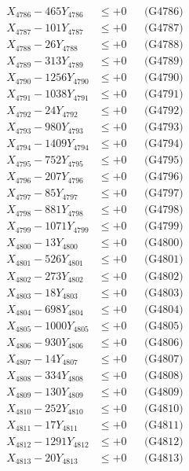 \documentclass[a4paper,10pt]{article}
\begin{document}
{\begin{align}
X_{4786} - 465Y_{4786} &\leq +0 && \text{(G4786)} \\
X_{4787} - 101Y_{4787} &\leq +0 && \text{(G4787)} \\
X_{4788} - 26Y_{4788} &\leq +0 && \text{(G4788)} \\
X_{4789} - 313Y_{4789} &\leq +0 && \text{(G4789)} \\
X_{4790} - 1256Y_{4790} &\leq +0 && \text{(G4790)} \\
\allowbreak
X_{4791} - 1038Y_{4791} &\leq +0 && \text{(G4791)} \\
X_{4792} - 24Y_{4792} &\leq +0 && \text{(G4792)} \\
X_{4793} - 980Y_{4793} &\leq +0 && \text{(G4793)} \\
X_{4794} - 1409Y_{4794} &\leq +0 && \text{(G4794)} \\
X_{4795} - 752Y_{4795} &\leq +0 && \text{(G4795)} \\
X_{4796} - 207Y_{4796} &\leq +0 && \text{(G4796)} \\
X_{4797} - 85Y_{4797} &\leq +0 && \text{(G4797)} \\
X_{4798} - 881Y_{4798} &\leq +0 && \text{(G4798)} \\
X_{4799} - 1071Y_{4799} &\leq +0 && \text{(G4799)} \\
X_{4800} - 13Y_{4800} &\leq +0 && \text{(G4800)} \\
\allowbreak
X_{4801} - 526Y_{4801} &\leq +0 && \text{(G4801)} \\
X_{4802} - 273Y_{4802} &\leq +0 && \text{(G4802)} \\
X_{4803} - 18Y_{4803} &\leq +0 && \text{(G4803)} \\
X_{4804} - 698Y_{4804} &\leq +0 && \text{(G4804)} \\
X_{4805} - 1000Y_{4805} &\leq +0 && \text{(G4805)} \\
X_{4806} - 930Y_{4806} &\leq +0 && \text{(G4806)} \\
X_{4807} - 14Y_{4807} &\leq +0 && \text{(G4807)} \\
X_{4808} - 334Y_{4808} &\leq +0 && \text{(G4808)} \\
X_{4809} - 130Y_{4809} &\leq +0 && \text{(G4809)} \\
X_{4810} - 252Y_{4810} &\leq +0 && \text{(G4810)} \\
\allowbreak
X_{4811} - 17Y_{4811} &\leq +0 && \text{(G4811)} \\
X_{4812} - 1291Y_{4812} &\leq +0 && \text{(G4812)} \\
X_{4813} - 20Y_{4813} &\leq +0 && \text{(G4813)} \\

\end{align}}
\end{document}

